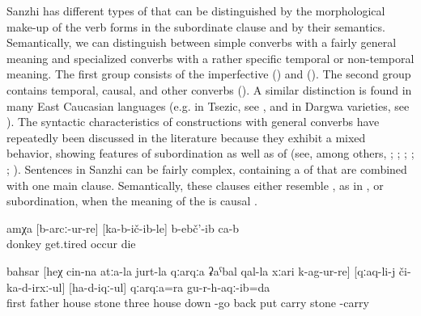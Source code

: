 Sanzhi has different types of  that can be distinguished by the morphological make-up of the verb forms in the subordinate clause and by their semantics. Semantically, we can distinguish between simple converbs with a fairly general meaning and specialized converbs with a rather specific temporal or non-temporal meaning. The first group consists of the imperfective () and  (). The second group contains temporal, causal, and other converbs (). A similar distinction is found in many East Caucasian languages (e.g. in Tsezic, see \citealp{Comrie.Forker.Khalilova2012}, and in Dargwa varieties, see \citealp{Belyaev2010}). The syntactic characteristics of constructions with general converbs have repeatedly been discussed in the literature  because they exhibit a mixed behavior, showing features of subordination as well as of  (see, among others, \citealp{Kazenin.Testelets2004}; \citealp{Haspelmath1995}; \citealp{Belyaev2010}; \citealp{Comrie.Forker.Khalilova2012}; \citealp{Creissels2010, Creissels2012}; \citealp{Forker2013b}). Sentences in Sanzhi can be fairly complex, containing a  of  that are combined with one main clause. Semantically, these clauses either resemble , as in , or subordination, when the meaning of the  is causal .
%
\begin{exe}
	\ex	\label{ex:‎‎‎The donkey got tired, fell down, and died}
	\gll	amχa	[b-arcː-ur-re]	[ka-b-ič-ib-le]	b-ebč'-ib	ca-b\\
		donkey	get.tired	occur	die	\\
	\glt	{}

	\ex	\label{ex:‎‎‎First, (because) the stones of father's house had fallen down}
	\gll	bahsar	[heχ	cin-na	atːa-la	jurt-la	qːarqːa	ʡaˁbal	qal-la	xːari	k-ag-ur-re]	[qːaq-li-j	či-ka-d-irxː-ul]	[ha-d-iqː-ul]	qːarqːa=ra	gu-r-h-aqː-ib=da\\
		first			father\tsc{-gen}	house	stone	three	house	down	-go		back	put\tsc{.ipfv-icvb}	carry	stone	-carry\\
	\glt	{}
\end{exe}

